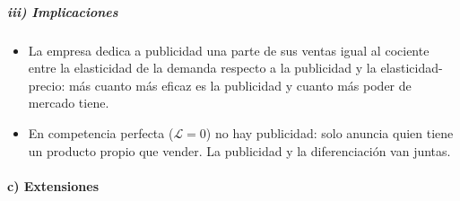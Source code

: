 \documentclass[11pt]{article}
\begin{document}
\subparagraph{iii) Implicaciones}

\begin{itemize}
\item La empresa dedica a publicidad una parte de sus ventas igual al cociente entre la elasticidad de la demanda respecto a la publicidad y la elasticidad-precio: más cuanto más eficaz es la publicidad y cuanto más poder de mercado tiene.
\item En competencia perfecta ($\mathcal{L}=0$) no hay publicidad: solo anuncia quien tiene un producto propio que vender. La publicidad y la diferenciación van juntas.
\end{itemize}

\paragraph{c) Extensiones}
\end{document}
